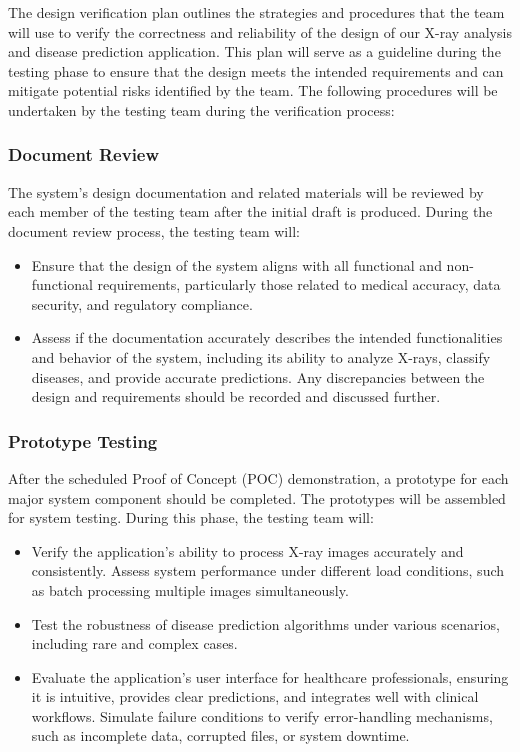 \documentclass[12pt, titlepage]{article}
\begin{document}
The design verification plan outlines the strategies and procedures that the team will use to verify the correctness and reliability of the design of our X-ray analysis and disease prediction application. This plan will serve as a guideline during the testing phase to ensure that the design meets the intended requirements and can mitigate potential risks identified by the team. The following procedures will be undertaken by the testing team during the verification process:

\subsubsection{Document Review}
The system's design documentation and related materials will be reviewed by each member of the testing team after the initial draft is produced. During the document review process, the testing team will:
\begin{itemize}
\item Ensure that the design of the system aligns with all functional and non-functional requirements, particularly those related to medical accuracy, data security, and regulatory compliance.
\item Assess if the documentation accurately describes the intended functionalities and behavior of the system, including its ability to analyze X-rays, classify diseases, and provide accurate predictions. Any discrepancies between the design and requirements should be recorded and discussed further.
\end{itemize}

\subsubsection{Prototype Testing}
After the scheduled Proof of Concept (POC) demonstration, a prototype for each major system component should be completed. The prototypes will be assembled for system testing. During this phase, the testing team will:
\begin{itemize}
\item Verify the application’s ability to process X-ray images accurately and consistently.
Assess system performance under different load conditions, such as batch processing multiple images simultaneously.
\item Test the robustness of disease prediction algorithms under various scenarios, including rare and complex cases.
\item Evaluate the application's user interface for healthcare professionals, ensuring it is intuitive, provides clear predictions, and integrates well with clinical workflows.
Simulate failure conditions to verify error-handling mechanisms, such as incomplete data, corrupted files, or system downtime.
\end{itemize}
\end{document}
